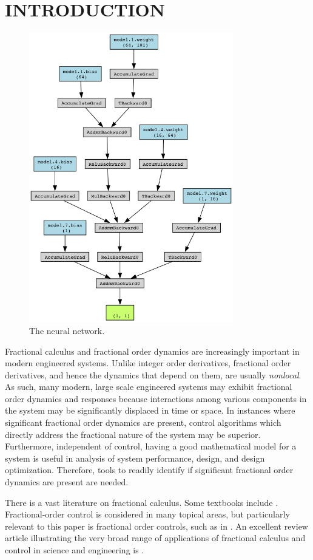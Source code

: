 \section{INTRODUCTION}

  \begin{figure}
  \centering
  \includegraphics[width=3.5in]{viz.png}
  \caption{The neural network.}
  \label{fig:thennet}
  \end{figure}


  Fractional calculus and fractional order dynamics are increasingly important
  in modern engineered systems. Unlike integer order derivatives, fractional
  order derivatives, and hence the dynamics that depend on them, are usually
  \emph{nonlocal}. As such, many modern, large scale engineered systems may
  exhibit fractional order dynamics and responses because interactions among
  various components in the system may be significantly displaced in time or
  space. In instances where significant fractional order dynamics are present,
  control algorithms which directly address the fractional nature of the system
  may be superior. Furthermore, independent of control, having a good
  mathematical model for a system is useful in analysis of system performance,
  design, and design optimization.  Therefore, tools to readily identify if
  significant fractional order dynamics are present are needed.

  There is a vast literature on fractional calculus. Some textbooks include
  \cite{fracbook,fracbook2,oustaloup}.  Fractional-order control is considered
  in many topical areas, but particularly relevant to this paper is fractional
  order controls, such as in \cite{fraccontrol,YQChenAcc}. An excellent review
  article illustrating the very broad range of applications of fractional
  calculus and control in science and engineering is \cite{SUN2018213}.


